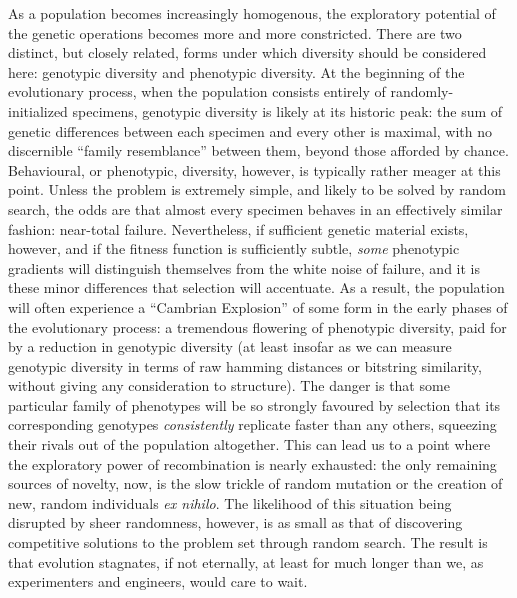 \documentclass[12pt,glossary]{dalthesis}
\begin{document}
As a population becomes increasingly homogenous, the exploratory potential of the
genetic operations becomes more and more constricted. There are two distinct, but
closely related, forms under which diversity should be considered here: genotypic
diversity and phenotypic diversity. At the beginning of the evolutionary process,
when the population consists entirely of randomly-initialized specimens,
genotypic diversity is likely at its historic peak: the sum of genetic
differences between each specimen and every other is maximal, with no
discernible ``family resemblance'' between them, beyond those afforded by chance.
Behavioural, or phenotypic, diversity, however, is typically rather meager at this
point. Unless the problem is extremely simple, and likely to be solved by random
search, the odds are that almost every specimen behaves in an effectively similar
fashion: near-total failure. Nevertheless, if sufficient genetic material exists, however, and if
the fitness function is sufficiently subtle, \emph{some} phenotypic gradients will 
distinguish themselves from the white noise of failure, and it is these minor differences
that selection will accentuate. As a result, the population will often experience a
``Cambrian Explosion'' of some form in the early phases of the evolutionary process: a
tremendous flowering of phenotypic diversity, paid for by a reduction in genotypic
diversity (at least insofar as we can measure genotypic diversity in terms of raw
hamming distances or bitstring similarity, without giving any consideration to structure).
The danger is that some particular family of phenotypes will be so strongly favoured
by selection that its corresponding genotypes \emph{consistently} replicate faster than any
others, squeezing their rivals out of the population altogether. This can lead us to a
point where the exploratory power of recombination is nearly exhausted: the only remaining
sources of novelty, now, is the slow trickle of random mutation or the creation of new,
random individuals \emph{ex nihilo}. The likelihood of this situation being disrupted by
sheer randomness, however, is as small as that of discovering competitive solutions to
the problem set through random search. The result is that evolution stagnates, if not
eternally, at least for much longer than we, as experimenters and engineers, would care
to wait.
\end{document}
